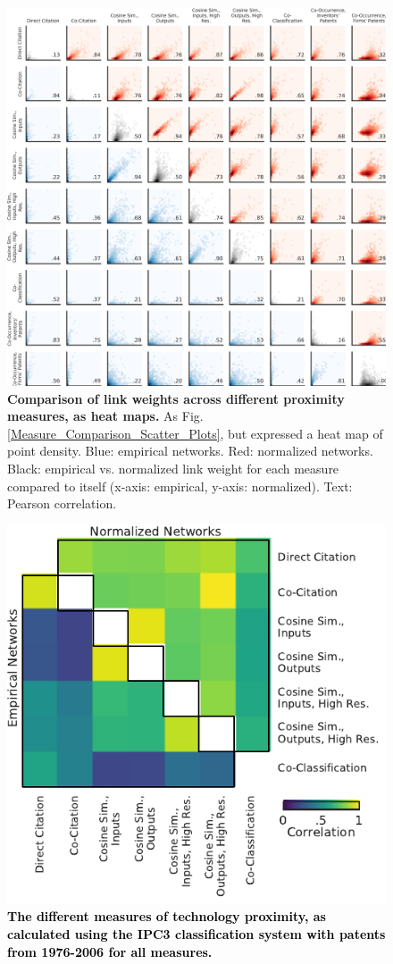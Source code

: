 \documentclass[]{svjour3}
\begin{document}
\begin{figure}[]
\centering
\includegraphics[width=\textwidth]{figs/Measure_Comparison_Hex_Plots_IPC.png} 
\caption{\textbf{Comparison of link weights across different proximity measures, as heat maps.} As Fig. \ref{Measure_Comparison_Scatter_Plots}, but expressed a heat map of point density. Blue: empirical networks. Red: normalized networks. Black: empirical vs. normalized link weight for each measure compared to itself (x-axis: empirical, y-axis: normalized). Text: Pearson correlation.
}\label{Measure_Comparison_Hex_Plots}
\end{figure}

\begin{figure}[p!]
\centering
\includegraphics[width=.7\textwidth]{figs/Network_Correlations_Linear_2006_IPC.pdf} 
\caption{\textcolor{black}{\textbf{The different measures of technology proximity, as calculated using the IPC3 classification system with patents from 1976-2006 for all measures.}}}\label{Network_Correlations_Linear_2006_IPC}
\end{figure}
\end{document}
